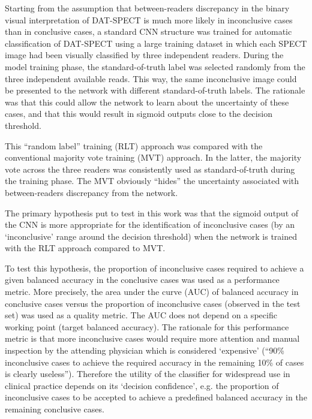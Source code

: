 Starting from the assumption that between-readers discrepancy in the binary visual interpretation of DAT-SPECT is much more likely in inconclusive cases 
than in conclusive cases, a standard CNN structure was trained for automatic classification of DAT-SPECT using a large training dataset in which each 
SPECT image had been visually classified by three independent readers. 
During the model training phase, the standard-of-truth label was selected randomly from the three independent available reads. 
This way, the same inconclusive image could be presented to the network with different standard-of-truth labels. 
The rationale was that this could allow the network to learn about the uncertainty of these cases, 
and that this would result in sigmoid outputs close to the decision threshold.

This “random label” training (RLT) approach was compared with the conventional majority vote training (MVT) approach. 
In the latter,  the majority vote across the three readers was consistently used as standard-of-truth during the training phase. 
The MVT obviously “hides” the uncertainty associated with between-readers discrepancy from the network. 


The primary hypothesis put to test in this work was that the sigmoid output of the CNN is more appropriate for the identification of inconclusive cases 
(by an `inconclusive' range around the decision threshold) when the network is trained with the RLT approach compared to MVT.

To test this hypothesis, the proportion of inconclusive cases required to achieve a given balanced accuracy in the conclusive cases 
was used as a performance metric.
More precisely, the area under the curve (AUC) of balanced accuracy in conclusive cases versus the proportion of inconclusive cases 
(observed in the test set) was used as a quality metric. 
The AUC does not depend on a specific working point (target balanced accuracy).  
The rationale for this performance metric is that more inconclusive cases would require more attention and manual inspection 
by the attending physician which is considered `expensive'
(“90\% inconclusive cases to achieve the required accuracy in the remaining 10\% of cases is clearly useless”).
Therefore the utility of the classifier for widespread use in clinical practice depends on its `decision confidence', 
e.g. the proportion of inconclusive cases to be accepted to achieve a predefined balanced accuracy in the remaining conclusive cases. 

